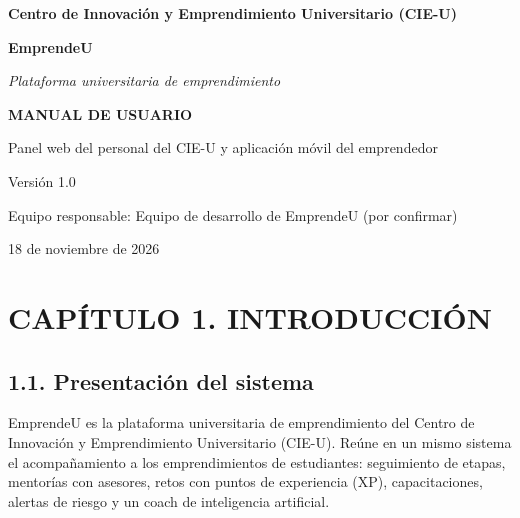 \documentclass[12pt,letterpaper]{article}
\begin{document}
\begin{titlepage}\thispagestyle{empty}\centering\singlespacing
{\bfseries Centro de Innovación y Emprendimiento Universitario (CIE-U)\par}\vspace{2.5cm}
{\fontsize{30}{36}\selectfont\bfseries EmprendeU\par}\vspace{.4cm}
{\itshape Plataforma universitaria de emprendimiento\par}\vspace{2cm}
{\fontsize{22}{26}\selectfont\bfseries MANUAL DE USUARIO\par}\vspace{.6cm}
Panel web del personal del CIE-U y aplicación móvil del emprendedor\par\vspace{2.5cm}
Versión 1.0\par\vspace{.4cm}Equipo responsable: Equipo de desarrollo de EmprendeU (por confirmar)\par\vspace{.4cm}18 de noviembre de 2026\par
\end{titlepage}
\pagestyle{apa}\setcounter{page}{2}
\clearpage
\tableofcontents\clearpage
\listoffigures\clearpage
\listoftables\clearpage
\doublespacing

\clearpage

\section*{CAPÍTULO 1. INTRODUCCIÓN}


\subsection*{1.1. Presentación del sistema}


EmprendeU es la plataforma universitaria de emprendimiento del Centro de Innovación y Emprendimiento Universitario (CIE-U). Reúne en un mismo sistema el acompañamiento a los emprendimientos de estudiantes: seguimiento de etapas, mentorías con asesores, retos con puntos de experiencia (XP), capacitaciones, alertas de riesgo y un coach de inteligencia artificial.
\end{document}
